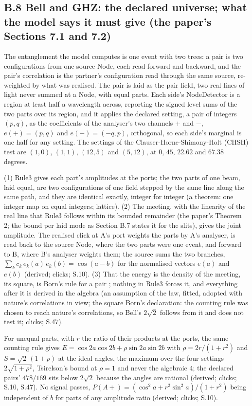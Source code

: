 \documentclass[pdflatex,sn-mathphys-num]{sn-jnl}
\theoremstyle{thmstyleone}
\begin{document}
\subsection*{B.8 Bell and GHZ: the declared universe; what the model says it must give (the paper's Sections 7.1 and 7.2)}

The entanglement the model computes is one event with two trees: a pair is two configurations from one source Node, each read forward and backward, and the pair's correlation is the partner's configuration read through the same source, re-weighted by what was realised. The pair is laid as the pair field, two real lines of light never summed at a Node, with equal parts. Each side's NodeDetector is a region at least half a wavelength across, reporting the signed level sums of the two parts over its region, and it applies the declared setting, a pair of integers $(p, q)$, as the coefficients of the analyser's two channels $+$ and $-$, $e(+) = (p, q)$ and $e(-) = (-q, p)$, orthogonal, so each side's marginal is one half for any setting. The settings of the Clauser-Horne-Shimony-Holt (CHSH) test are $(1, 0)$, $(1, 1)$, $(12, 5)$ and $(5, 12)$, at $0$, $45$, $22.62$ and $67.38$ degrees.

(1) Rule3 gives each part's amplitudes at the ports; the two parts of one beam, laid equal, are two configurations of one field stepped by the same line along the same path, and they are identical exactly, integer for integer (a theorem: one integer map on equal integers; lattice). (2) The meeting, with the linearity of the real line that Rule3 follows within its bounded remainder (the paper's Theorem 2; the bound per laid mode as Section B.7 states it for the slits), gives the joint amplitude. The realised click at A's port weights the parts by A's analyser, is read back to the source Node, where the two parts were one event, and forward to B, where B's analyser weights them; the source sums the two branches, $\sum_k c_k\,e_k(a)\,e_k(b) = \cos(a - b)$ for the normalised vectors $e(a)$ and $e(b)$ (derived; clicks; S.10). (3) That the energy is the density of the meeting, its square, is Born's rule for a pair \cite{born}; nothing in Rule3 forces it, and everything after it is derived in the algebra (an assumption of the law, fitted, adopted with nature's correlations in view; the square Born's declaration: the counting rule was chosen to reach nature's correlations, so Bell's $2\sqrt 2$ follows from it and does not test it; clicks; S.47).

For unequal parts, with $r$ the ratio of their products at the ports, the same counting rule gives $E = \cos 2a\cos 2b + \rho\sin 2a\sin 2b$ with $\rho = 2r / (1 + r^2)$ and $S = \sqrt 2\,(1 + \rho)$ at the ideal angles, the maximum over the four settings $2\sqrt{1 + \rho^2}$, Tsirelson's bound \cite{cirelson} at $\rho = 1$ and never the algebraic $4$; the declared pairs' $478 / 169$ sits below $2\sqrt 2$ because the angles are rational (derived; clicks; S.10, S.47). No signal passes, $P(A+) = (\cos^2 a + r^2\sin^2 a) / (1 + r^2)$ being independent of $b$ for parts of any amplitude ratio (derived; clicks; S.10).
\end{document}
